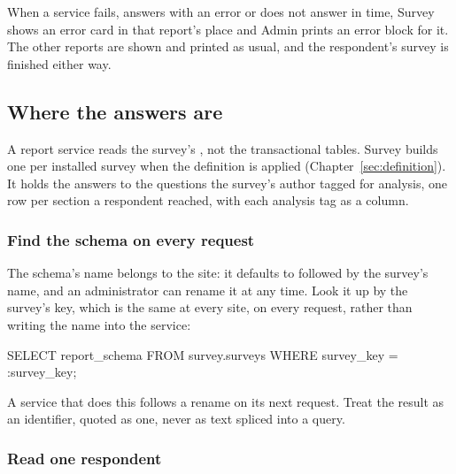 \documentclass[11pt, a4paper]{article}
\begin{document}
When a service fails, answers with an error or does not answer in time, Survey shows an error
card in that report's place and Admin prints an error block for it. The other reports are
shown and printed as usual, and the respondent's survey is finished either way.

\subsection{Where the answers are}
\label{sec:reports-data}

A report service reads the survey's , not the transactional tables.
Survey builds one per installed survey when the definition is applied
(Chapter~\ref{sec:definition}). It holds the answers to the questions the survey's author
tagged for analysis, one row per section a respondent reached, with each analysis tag as a
column.

\subsubsection*{Find the schema on every request}

The schema's name belongs to the site: it defaults to  followed by the survey's
name, and an administrator can rename it at any time. Look it up by the survey's key, which
is the same at every site, on every request, rather than writing the name into the service:

\begin{elicitsql}
SELECT report_schema FROM survey.surveys WHERE survey_key = :survey_key;
\end{elicitsql}

A service that does this follows a rename on its next request. Treat the result as an
identifier, quoted as one, never as text spliced into a query.

\subsubsection*{Read one respondent}
\end{document}

